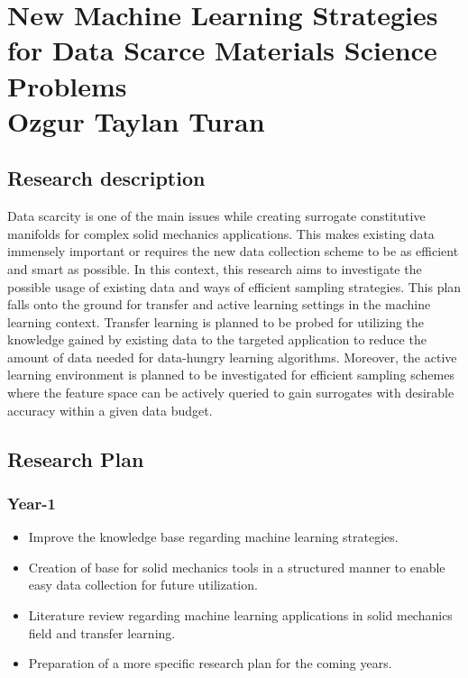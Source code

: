 \documentclass{report}
\begin{document}
	\section*{ \centering New Machine Learning Strategies for Data Scarce Materials Science Problems \\\vspace{1cm} \centering Ozgur Taylan Turan \vspace{1cm}}
	\subsection*{Research description}
	
	Data scarcity is one of the main issues while creating surrogate constitutive manifolds for complex solid mechanics applications. This makes existing data immensely important or requires the new data collection scheme to be as efficient and smart as possible. In this context, this research aims to investigate the possible usage of existing data and ways of efficient sampling strategies. This plan falls onto the ground for transfer and active learning settings in the machine learning context. Transfer learning is planned to be probed for utilizing the knowledge gained by existing data to the targeted application to reduce the amount of data needed for data-hungry learning algorithms. Moreover, the active learning environment is planned to be investigated for efficient sampling schemes where the feature space can be actively queried to gain surrogates with desirable accuracy within a given data budget.
	
	\subsection*{Research Plan}
	
	\subsubsection*{Year-1}
	
	\begin{itemize}
		\item Improve the knowledge base regarding machine learning strategies.
		\item Creation of base for solid mechanics tools in a structured manner to enable easy data collection for future utilization.
		\item Literature review regarding machine learning applications in solid mechanics field and transfer learning.
		\item Preparation of a more specific research plan for the coming years.
	\end{itemize}
	
	
	

	
	
\end{document}
